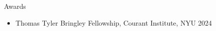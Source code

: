 \documentclass{resume} %
\begin{document}





\begin{rSection}{Awards}
\begin{itemize}
    \item Thomas Tyler Bringley Fellowship, Courant Institute, NYU \hfill 2024
\end{itemize}
\end{rSection}
\end{document}
